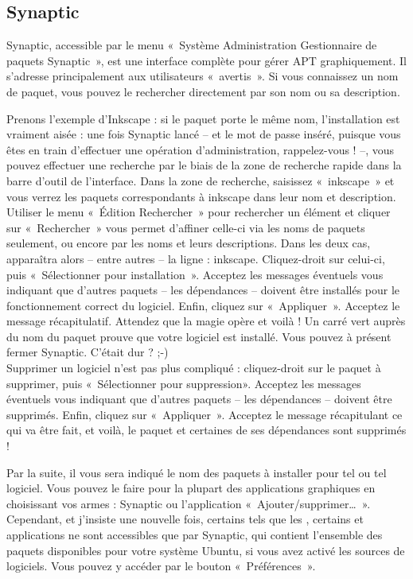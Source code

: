 {\subsection{Synaptic}
\label{RefInstallSynaptic}
Synaptic, accessible par le menu «~Système \FlecheDroite Administration \FlecheDroite Gestionnaire de paquets Synaptic~», est une interface complète pour gérer APT graphiquement. Il s'adresse principalement aux utilisateurs «~avertis~». Si vous connaissez un nom de paquet, vous pouvez le rechercher directement par son nom ou sa description.\par
{}
Prenons l'exemple d'Inkscape : si le paquet porte le même nom, l'installation est vraiment aisée : une fois Synaptic lancé -- et le mot de passe inséré, puisque vous êtes en train d'effectuer une opération d'administration, rappelez-vous ! --, vous pouvez effectuer une recherche par le biais de la zone de recherche rapide dans la barre d'outil de l'interface. Dans la zone de recherche, saisissez «~inkscape~» et vous verrez les paquets correspondants à inkscape dans leur nom et description. Utiliser le menu «~Édition \FlecheDroite Rechercher~» pour rechercher un élément et cliquer sur «~Rechercher~» vous permet d'affiner celle-ci via les noms de paquets seulement, ou encore par les noms et leurs descriptions. Dans les deux cas, apparaîtra alors -- entre autres -- la ligne : inkscape. Cliquez-droit sur celui-ci, puis «~Sélectionner pour installation~». Acceptez les messages éventuels vous indiquant que d'autres paquets -- les dépendances -- doivent être installés pour le fonctionnement correct du logiciel. Enfin, cliquez sur «~Appliquer~». Acceptez le message récapitulatif. Attendez que la magie opère et voilà ! Un carré vert auprès du nom du paquet prouve que votre logiciel est installé. Vous pouvez à présent fermer Synaptic. C'était dur ? ;-)\\
Supprimer un logiciel n'est pas plus compliqué : cliquez-droit sur le paquet à supprimer, puis «~Sélectionner pour suppression». Acceptez les messages éventuels vous indiquant que d'autres paquets -- les dépendances -- doivent être supprimés. Enfin, cliquez sur «~Appliquer~». Acceptez le message récapitulant ce qui va être fait, et voilà, le paquet et certaines de ses dépendances sont supprimés !
\begin{nota}
Par la suite, il vous sera indiqué le nom des paquets à installer pour tel ou tel logiciel. Vous pouvez le faire pour la plupart des applications graphiques en choisissant vos armes : Synaptic ou l'application «~Ajouter/supprimer\dots{}~». Cependant, et j'insiste une nouvelle fois, certains  tels que les  , certains  et applications ne sont accessibles que par Synaptic, qui contient l'ensemble des paquets disponibles pour votre système Ubuntu, si vous avez activé les sources de logiciels. Vous pouvez y accéder par le bouton «~Préférences~».\\

\end{nota}}
